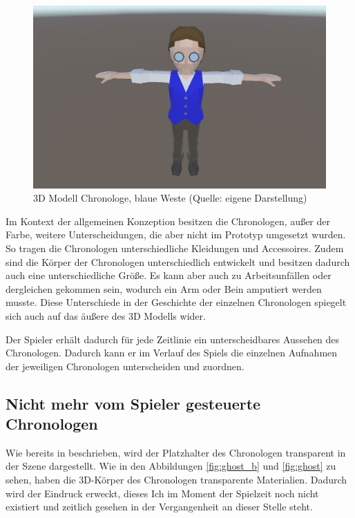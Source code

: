 \begin{figure}[ht]
\centering
\includegraphics[width=0.8\linewidth]{content/pictures/Chronologe_b.jpg}
\caption{3D Modell Chronologe, blaue Weste (Quelle: eigene Darstellung)}
\label{fig:chronologe_b}
\end{figure}

Im Kontext der allgemeinen Konzeption besitzen die Chronologen, außer der Farbe, weitere Unterscheidungen, die aber nicht im Prototyp umgesetzt wurden. So tragen die Chronologen unterschiedliche Kleidungen und Accessoires. Zudem sind die Körper der Chronologen unterschiedlich entwickelt und besitzen dadurch auch eine unterschiedliche Größe. Es kann aber auch zu Arbeitsunfällen oder dergleichen gekommen sein, wodurch ein Arm oder Bein amputiert werden musste. Diese Unterschiede in der Geschichte der einzelnen Chronologen spiegelt sich auch auf das äußere des \ac{3D} Modells wider. 

Der Spieler erhält dadurch für jede Zeitlinie ein unterscheidbares Aussehen des Chronologen. Dadurch kann er im Verlauf des Spiels die einzelnen Aufnahmen der jeweiligen Chronologen unterscheiden und zuordnen.

\subsection{Nicht mehr vom Spieler gesteuerte Chronologen}
Wie bereits in  beschrieben, wird der Platzhalter des Chronologen transparent in der Szene dargestellt. Wie in den Abbildungen \ref{fig:ghost_b} und \ref{fig:ghost} zu sehen, haben die \ac{3D}-Körper des Chronologen transparente Materialien. Dadurch wird der Eindruck erweckt, dieses Ich im Moment der Spielzeit noch nicht existiert und zeitlich gesehen in der Vergangenheit an dieser Stelle steht.

